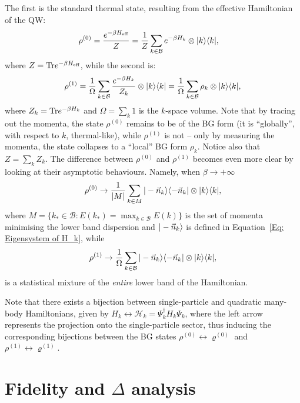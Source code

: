 The first is the standard thermal state, resulting from the effective Hamiltonian of the QW:
\begin{eqnarray}
\label{rho_0}
\rho^{(0)} &= \frac{e^{-\beta H_{\text{eff}}}}{Z}= \frac{1}{Z}\sum_{k \in \mathcal B} e^{-\beta H_k}\otimes | k \rangle\langle k |,
\end{eqnarray}
where $Z=\text{Tr} e^{-\beta H_{\text{eff}}}$, while the second is:
\begin{equation}
\label{rho_1}
\rho^{(1)} = \frac{1}{\Omega}\sum_{k \in \mathcal B} \frac{e^{-\beta H_k}}{Z_k}\otimes | k \rangle\langle k | = \frac{1}{\Omega}\sum_{k \in \mathcal B} \rho_k\otimes | k \rangle\langle k |,
\end{equation}
where $Z_k=\text{Tr} e^{-\beta H_k}$ and $\Omega=\sum_k 1$ is the $k$-space volume. Note that by tracing out the momenta, the state $\rho^{(0)}$ remains to be of the BG form (it is ``globally'', with respect to $k$, thermal-like), while $\rho^{(1)}$ is not -- only by measuring the momenta, the state collapses to a ``local'' BG form $\rho_k$. Notice also that $Z=\sum_k Z_k$. The difference between $\rho^{(0)}$ and $\rho^{(1)}$ becomes even more clear by looking at their asymptotic behaviours. Namely, when $\beta\rightarrow +\infty$
\begin{equation}
\rho^{(0)}\rightarrow \frac{1}{|M|}\sum_{k\in M} | -\vec{n}_k \rangle\langle -\vec{n}_k |\otimes | k \rangle\langle k |,
\label{eq:rho0_lim}
\end{equation}
where $M=\{k_{*}\in \mathcal B : E(k_*) = \max_{k\in \mathcal B} E(k)\}$ is the set of momenta minimising the lower band dispersion and $| -\vec{n}_k \rangle$ is defined in Equation~\eqref{Eq: Eigensystem of H_k}, while
\begin{equation}
\rho^{(1)}\rightarrow \frac{1}{\Omega}\sum_{k \in \mathcal B} | -\vec{n}_k \rangle\langle -\vec{n}_k |\otimes| k \rangle\langle k |,	
\label{eq:rho1_lim}
\end{equation}
is a statistical mixture of the {\em entire} lower band of the Hamiltonian.

Note that there exists a bijection between single-particle and quadratic many-body Hamiltonians, given by $ H_k\leftrightarrow \mathcal{H}_k = \Psi^{\dagger}_k H_k \Psi_k $,
where the left arrow represents the projection onto the single-particle sector, thus inducing the corresponding bijections between the BG states $\rho^{(0)} \leftrightarrow \varrho^{(0)}$ and $\rho^{(1)} \leftrightarrow \varrho^{(1)}$.

\section{Fidelity and $\Delta$ analysis}
\label{sec:results}


